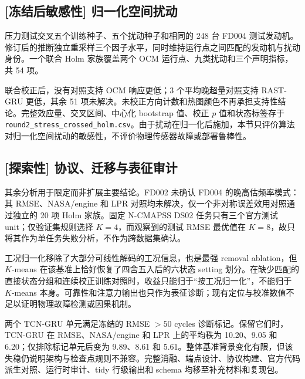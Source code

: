 \subsection{[冻结后敏感性] 归一化空间扰动}

压力测试交叉五个训练种子、五个扰动种子和相同的 248 台 FD004 测试发动机。修订后的推断独立重采样三个因子水平，同时维持运行点之间匹配的发动机与扰动身份。一个联合 Holm 家族覆盖两个 OCM 运行点、九类扰动和三个声明指标，共 54 项。



联合校正后，没有对照支持 OCM 响应更低；3 个平均晚超量对照支持 RAST-GRU 更低，其余 51 项未解决。未校正方向计数和热图颜色不再承担支持性结论。完整效应量、交叉区间、中心化 bootstrap 值、校正 $p$ 值和状态标签存于 \texttt{round2\_stress\_crossed\_holm.csv}。由于扰动在归一化后施加，本节只评价算法对归一化空间扰动的敏感性，不评价物理传感器故障或部署鲁棒性。

\subsection{[探索性] 协议、迁移与表征审计}

其余分析用于限定而非扩展主要结论。FD002 未确认 FD004 的晚高估频率模式：其 RMSE、NASA/engine 和 LPR 对照均未解决，仅一个非对称误差效用对照通过独立的 20 项 Holm 家族。固定 N-CMAPSS DS02 任务只有三个官方测试 unit；仅验证集规则选择 $K=4$，而观察到的测试 RMSE 最优值在 $K=8$，故只将其作为单任务失败分析，不作为跨数据集确认。

工况归一化移除了大部分可线性解码的工况信息，也是最强 removal ablation，但 $K$-means 在该基准上恰好恢复了四舍五入后的六状态 setting 划分。在缺少匹配的直接状态分组和连续校正训练对照时，收益只能归于“按工况归一化”，不能归于 $K$-means 本身。可靠性和注意力输出也只作为表征诊断；现有定位与校准数值不足以证明物理故障检测或因果机制。

两个 TCN-GRU 单元满足冻结的 RMSE $>50$ cycles 诊断标记。保留它们时，TCN-GRU 在 RMSE、NASA/engine 和 LPR 上的平均秩为 10.20、9.05 和 6.20；仅排除标记单元后变为 9.89、8.61 和 5.61。整体基准背景变化有限，但该失稳仍说明架构与检查点规则不兼容。完整消融、端点设计、协议构建、官方代码派生对照、运行时审计、tidy 行级输出和 schema 均移至补充材料和复现包。
\FloatBarrier
